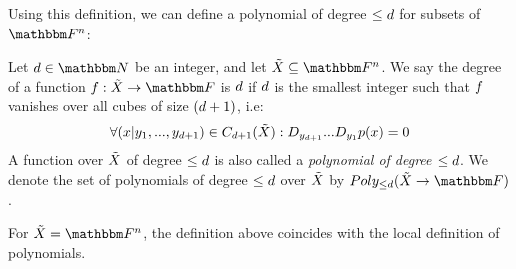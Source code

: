 Using this definition, we can define a polynomial of degree $\leq d$ for subsets of $\field$:
\begin{definition}
    Let $\degree \in \naturalnumbersset$ be an integer, and let $\variety \subseteq \field$.
    We say the degree of a function $\funcdef{\onvarfunc}{\variety}{\basefield}$ is $d$
    if $d$ is the smallest integer such that $\onvarfunc$ vanishes over all cubes of size $(d+1)$, i.e:
    \[
        \forall {\cube{x}{y_1,...,y_{\degree + 1}} \in \cubes{\degree+1}{\variety}}:
            \directionderivative_{y_{\degree + 1}}...\directionderivative_{y_1} \onvarpoly(x) = 0
    \]
    A function over ${\tilde{X}}$ of degree $\leq d$ is also called a \emph{polynomial of degree $\leq d$}.
    We denote the set of polynomials of degree $\leq d$ over ${\tilde{X}}$ by $\allpolyset{\leq \degree}{\variety}{\basefield}$.
\end{definition}
\begin{note*}
    For $\variety = \field$, the definition above coincides with the local definition of polynomials.
\end{note*}

